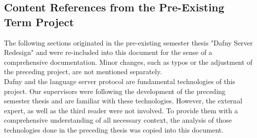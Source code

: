 \subsection{Content References from the Pre-Existing Term Project}
The following sections originated in the pre-existing semester thesis "Dafny Server Redesign" \cite{sa} and were re-included into this document for the sense of a comprehensive documentation.
Minor changes, such as typos or the adjustment of the preceding project, are not mentioned separately.\\

Dafny and the language server protocol are fundamental technologies of this project.
Our supervisors were following the development of the preceding semester thesis and are familiar with these technologies.
However, the external expert, as well as the third reader were not involved.
To provide them with a comprehensive understanding of all necessary context, the analysis of those technologies done in the preceding thesis was copied into this document.



